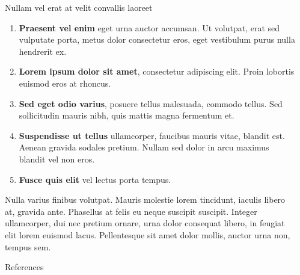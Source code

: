 \documentclass[final]{beamer}
\newlength{\sepwidth}
\newlength{\colwidth}
\newcommand{\separatorcolumn}{\begin{column}{\sepwidth}\end{column}}
\begin{document}
\begin{frame}[t]
\begin{columns}[t]
\begin{column}{\colwidth}
\begin{block}{Nullam vel erat at velit convallis laoreet}
    \begin{enumerate}
      \item \textbf{Praesent vel enim} eget urna auctor accumsan. Ut volutpat, erat sed vulputate porta, metus dolor consectetur eros, eget vestibulum purus nulla hendrerit ex.
      \item \textbf{Lorem ipsum dolor sit amet}, consectetur adipiscing elit. Proin lobortis euismod eros at rhoncus.
      \item \textbf{Sed eget odio varius}, posuere tellus malesuada, commodo tellus. Sed sollicitudin mauris nibh, quis mattis magna fermentum et.
      \item \textbf{Suspendisse ut tellus} ullamcorper, faucibus mauris vitae, blandit est. Aenean gravida sodales pretium. Nullam sed dolor in arcu maximus blandit vel non eros.
      \item \textbf{Fusce quis elit} vel lectus porta tempus.
    \end{enumerate}

    Nulla varius finibus volutpat. Mauris molestie lorem tincidunt, iaculis
    libero at, gravida ante. Phasellus at felis eu neque suscipit suscipit.
    Integer ullamcorper, dui nec pretium ornare, urna dolor consequat libero,
    in feugiat elit lorem euismod lacus. Pellentesque sit amet dolor mollis,
    auctor urna non, tempus sem.

  \end{block}

  \begin{block}{References}

    \nocite{*}
    \footnotesize{}

  \end{block}

\end{column}

\separatorcolumn
\end{columns}

\end{frame}

\fi
\end{document}
